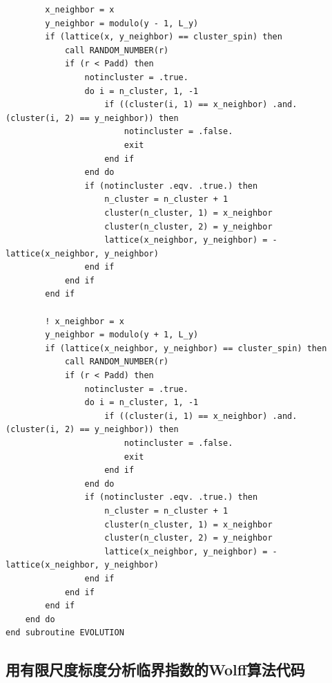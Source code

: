 \documentclass[UTF8,10pt,a4paper]{article}
\theoremstyle{Problem}
\theoremstyle{Solution}
\begin{document}
\begin{lstlisting}
        x_neighbor = x
        y_neighbor = modulo(y - 1, L_y)
        if (lattice(x, y_neighbor) == cluster_spin) then
            call RANDOM_NUMBER(r)
            if (r < Padd) then
                notincluster = .true.
                do i = n_cluster, 1, -1
                    if ((cluster(i, 1) == x_neighbor) .and. (cluster(i, 2) == y_neighbor)) then
                        notincluster = .false.
                        exit
                    end if
                end do
                if (notincluster .eqv. .true.) then
                    n_cluster = n_cluster + 1
                    cluster(n_cluster, 1) = x_neighbor
                    cluster(n_cluster, 2) = y_neighbor
                    lattice(x_neighbor, y_neighbor) = -lattice(x_neighbor, y_neighbor)
                end if
            end if
        end if

        ! x_neighbor = x
        y_neighbor = modulo(y + 1, L_y)
        if (lattice(x_neighbor, y_neighbor) == cluster_spin) then
            call RANDOM_NUMBER(r)
            if (r < Padd) then
                notincluster = .true.
                do i = n_cluster, 1, -1
                    if ((cluster(i, 1) == x_neighbor) .and. (cluster(i, 2) == y_neighbor)) then
                        notincluster = .false.
                        exit
                    end if
                end do
                if (notincluster .eqv. .true.) then
                    n_cluster = n_cluster + 1
                    cluster(n_cluster, 1) = x_neighbor
                    cluster(n_cluster, 2) = y_neighbor
                    lattice(x_neighbor, y_neighbor) = -lattice(x_neighbor, y_neighbor)
                end if
            end if
        end if
    end do
end subroutine EVOLUTION
\end{lstlisting}

\subsection{用有限尺度标度分析临界指数的Wolff算法代码}
\end{document}
